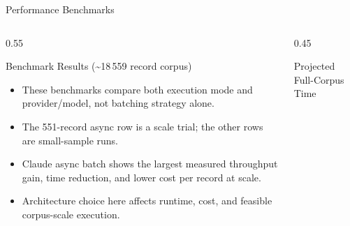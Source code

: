 \documentclass[
        11pt,
        compress,
        xcolor={dvipsnames}
    ]{beamer}
\begin{document}
\begin{frame}[shrink=4]{Performance Benchmarks}
  \begin{columns}[T]
    \begin{column}{0.55\textwidth}
      \begin{block}{Benchmark Results (\textasciitilde18\,559 record corpus)}
        \scriptsize
      \end{block}
      \vspace{0.3em}
      \scriptsize
      \begin{itemize}\setlength{\itemsep}{0.2em}
        \item These benchmarks compare both execution mode and provider/model, not batching strategy alone.
        \item The 551-record async row is a scale trial; the other rows are small-sample runs.
        \item Claude async batch shows the largest measured throughput gain, time reduction, and lower cost per record at scale.
        \item Architecture choice here affects runtime, cost, and feasible corpus-scale execution.
      \end{itemize}
    \end{column}
    \begin{column}{0.45\textwidth}
      \begin{block}{Projected Full-Corpus Time}
        \centering
        \scriptsize
        \vspace{0.3em}
        \begin{tikzpicture}

\end{tikzpicture}
\end{block}
\end{column}
\end{columns}
\end{frame}
\end{document}

